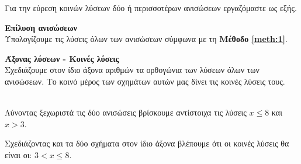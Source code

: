 \documentclass[twoside,nofonts,internet,methodoi]{thewria}
\begin{document}
\begin{Methodos}
Για την εύρεση κοινών λύσεων δύο ή περισσοτέρων ανισώσεων εργαζόμαστε ως εξής.
\begin{bhma}
\item \textbf{Επίλυση ανισώσεων}\\
Υπολογίζουμε τις λύσεις όλων των ανισώσεων σύμφωνα με τη \textbf{Μέθοδο \ref{meth:1}}.
\item \textbf{Άξονας λύσεων - Κοινές λύσεις}\\
Σχεδιάζουμε στον ίδιο άξονα αριθμών τα ορθογώνια των λύσεων όλων των ανισώσεων. Το κοινό μέρος των σχημάτων αυτών μας δίνει τις κοινές λύσεις τους.
\end{bhma}
\end{Methodos}
\lysh\\
Λύνοντας ξεχωριστά τις δύο ανισώσεις βρίσκουμε αντίστοιχα τις λύσεις $ x\leq 8 $ και $ x>3 $.
\begin{center}
\end{center}
Σχεδιάζοντας και τα δύο σχήματα στον ίδιο άξονα βλέπουμε ότι οι κοινές λύσεις θα είναι οι: $ 3<x\leq 8 $.
\end{document}
